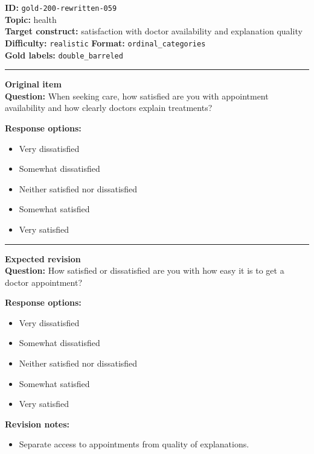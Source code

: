 \documentclass[10pt,a4paper]{article}
\newcommand{\sectionline}{\vspace{0.15em}\hrule\vspace{0.35em}}
\begin{document}
\begin{tcolorbox}[colframe=FlawRed,colback=white,colbacktitle=FlawRed!9,coltitle=black,title={Item 059\hfill Flawed item}]
\textbf{ID:} \texttt{gold-200-rewritten-059}\\
\textbf{Topic:} health\\
\textbf{Target construct:} satisfaction with doctor availability and explanation quality\\
\textbf{Difficulty:} \texttt{realistic} \quad \textbf{Format:} \texttt{ordinal\_categories}\\
\textbf{Gold labels:} \texttt{double\_barreled}\\
\sectionline
\textbf{Original item}\\
\textbf{Question:} When seeking care, how satisfied are you with appointment availability and how clearly doctors explain treatments?
\par\textbf{Response options:}
\begin{itemize}
\item Very dissatisfied
\item Somewhat dissatisfied
\item Neither satisfied nor dissatisfied
\item Somewhat satisfied
\item Very satisfied
\end{itemize}
\sectionline
\textbf{Expected revision}\\
\textbf{Question:} How satisfied or dissatisfied are you with how easy it is to get a doctor appointment?
\par\textbf{Response options:}
\begin{itemize}
\item Very dissatisfied
\item Somewhat dissatisfied
\item Neither satisfied nor dissatisfied
\item Somewhat satisfied
\item Very satisfied
\end{itemize}
\par\textbf{Revision notes:}
\begin{itemize}
\item Separate access to appointments from quality of explanations.
\end{itemize}
\end{tcolorbox}
\end{document}
